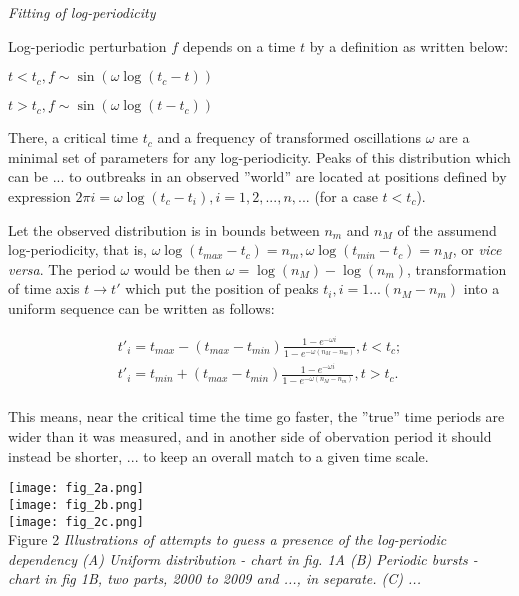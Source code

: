 \documentclass[a4paper]{article}
\begin{document}
\textit{Fitting of log-periodicity}

Log-periodic perturbation $f$ depends on a time $t$ by a definition as written below: 

$t < t_c, f \sim \sin( \omega \log( t_c - t ) )$

$t > t_c, f \sim \sin( \omega \log( t - t_c ) )$

There, a critical time $t_c$ and a frequency of transformed oscillations $\omega$ are a minimal set of parameters for any log-periodicity. Peaks of this distribution which can be ... to outbreaks in an observed ''world'' are located at positions defined by expression $ 2 \pi i =  \omega \log( t_c - t_i ), i = 1, 2,  ..., n, ... $ (for a case $t < t_c$).

Let the observed distribution is in bounds between $n_m$ and $n_M$ of the assumend log-periodicity, that is, $\omega \log( t_{max} - t_c )  = n_m, \omega \log( t_{min} - t_c ) = n_M$, or \textit{vice versa}. The period $\omega$ would be then $\omega = \log( n_M ) - \log( n_m ) $, transformation of time axis $t \to t'$ which put the position of peaks $t_i, i = 1 ... (n_M - n_m)$ into a uniform sequence can be written as follows:

\begin{eqnarray}
t'_i = t_{max} - ( t_{max} - t_{min} )\frac{ 1 - e^{ - \omega i } }{ 1 - e^{ - \omega (n_M - n_m) } }, t < t_c; \nonumber\\
t'_i = t_{min} + ( t_{max} - t_{min} )\frac{ 1 - e^{ - \omega i } }{ 1 - e^{ - \omega (n_M - n_m) } }, t > t_c. \\
\end{eqnarray}

This means, near the critical time the time go faster, the ''true'' time periods are wider than it was measured, and in another side of obervation period it should instead be shorter, ... to keep an overall match to a given time scale. 

\newpage

\noindent
\texttt{[image: fig\_2a.png]}\\
\texttt{[image: fig\_2b.png]}\\
\texttt{[image: fig\_2c.png]}\\
\vskip 12pt
Figure 2 \textit{Illustrations of attempts to guess a presence of the log-periodic dependency (A) Uniform distribution - chart in fig. 1A (B) Periodic bursts - chart in fig 1B, two parts, 2000 to 2009 and ..., in separate. (C) ...}
\vskip 12pt
\end{document}
